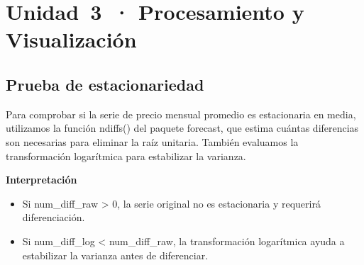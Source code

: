 \documentclass[
  11pt,
]{book}
\begin{document}
\chapter{Unidad~3~· Procesamiento y Visualización}\label{unidad3}

\section{Prueba de estacionariedad}\label{prueba-de-estacionariedad}

Para comprobar si la serie de precio mensual promedio es estacionaria en media, utilizamos la función ndiffs() del paquete forecast, que estima cuántas diferencias son necesarias para eliminar la raíz unitaria. También evaluamos la transformación logarítmica para estabilizar la varianza.

\textbf{Interpretación}

\begin{itemize}
\item
  Si num\_diff\_raw \textgreater{} 0, la serie original no es estacionaria y requerirá diferenciación.
\item
  Si num\_diff\_log \textless{} num\_diff\_raw, la transformación logarítmica ayuda a estabilizar la varianza antes de diferenciar.
\end{itemize}
\end{document}
